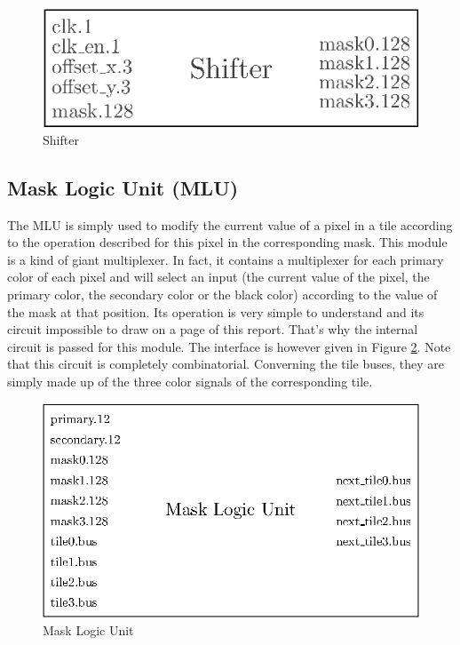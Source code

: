 \begin{figure}[H]
    \centering
    \includegraphics[scale=1.0]{Chapter4-GPU_CLKU/res/shifter}
    \caption{Shifter}
    \label{fig:gpu/shifter}
\end{figure}


\subsection{Mask Logic Unit (MLU)}

The MLU is simply used to modify the current value of a pixel in a tile according to the operation 
described for this pixel in the corresponding mask. This module is a kind of giant multiplexer. In 
fact, it contains a multiplexer for each primary color of each pixel and will select an input 
(the current value of the pixel, the primary color, the secondary color or the black color) 
according to the value of the mask at that position. Its operation is very simple to understand 
and its circuit impossible to draw on a page of this report. That's why the internal circuit is 
passed for this module. The interface is however given in Figure \ref{fig:gpu/mlu}.
Note that this circuit is completely combinatorial. Converning the tile buses, they are simply
made up of the three color signals of the corresponding tile.

\begin{figure}[H]
    \centering
    \includegraphics[scale=1.0]{Chapter4-GPU_CLKU/res/mlu}
    \caption{Mask Logic Unit}
    \label{fig:gpu/mlu}
\end{figure}

